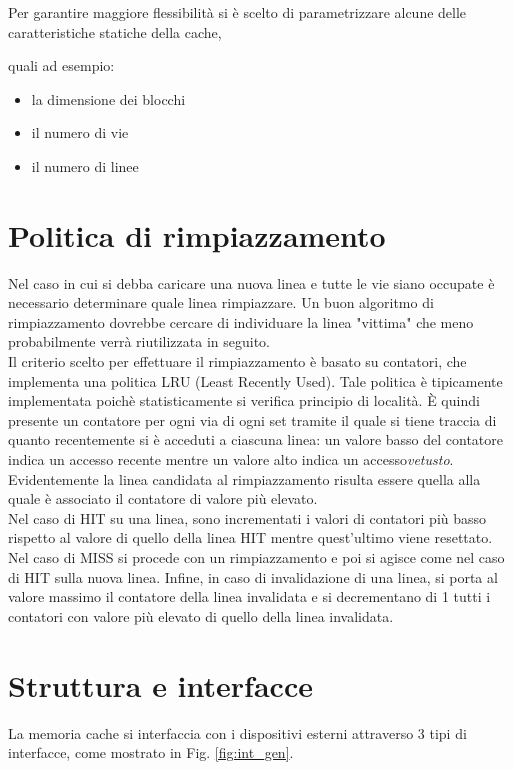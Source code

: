 Per garantire maggiore flessibilit\`a si \`e scelto di parametrizzare alcune delle caratteristiche statiche della cache,

quali ad esempio:
\begin{itemize}
\item la dimensione dei blocchi
\item il numero di vie
\item il numero di linee
\end{itemize}


\section{Politica di rimpiazzamento}

Nel caso in cui si debba caricare una nuova linea e tutte le vie siano occupate \`e necessario determinare quale linea rimpiazzare.
Un buon algoritmo di rimpiazzamento dovrebbe cercare di individuare la linea "vittima" che meno probabilmente verr\`a riutilizzata in seguito.\\
Il criterio scelto per effettuare il rimpiazzamento \`e basato su contatori, che implementa una politica LRU (Least Recently Used).
Tale politica \`e tipicamente implementata poich\`e statisticamente si verifica principio di localit\`a.
\`E quindi presente un contatore per ogni via di ogni set tramite il quale si tiene traccia di quanto recentemente si \`e acceduti a ciascuna linea: un valore basso del contatore indica un accesso recente mentre un valore alto indica un accesso\emph{vetusto}.
Evidentemente la linea candidata al rimpiazzamento risulta essere quella alla quale \`e associato il contatore di valore pi\`u elevato.\\
Nel caso di HIT su una linea, sono incrementati i valori di contatori pi\`u basso rispetto al valore di quello della linea HIT mentre quest'ultimo viene resettato.
Nel caso di MISS si procede con un rimpiazzamento e poi si agisce come nel caso di HIT sulla nuova linea.
Infine, in caso di invalidazione di una linea, si porta al valore massimo il contatore della linea invalidata e si decrementano di 1 tutti i contatori con valore pi\`u elevato di quello della linea invalidata.


\section{Struttura e interfacce}
La memoria cache si interfaccia con i dispositivi esterni attraverso 3 tipi di interfacce, come mostrato in Fig. \ref{fig:int_gen}.


